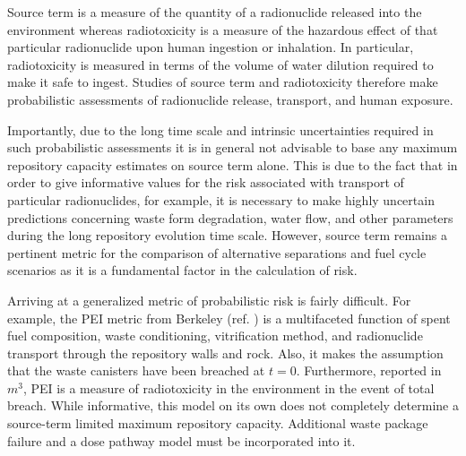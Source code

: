 Source term is a measure of the quantity of a radionuclide released into the 
environment whereas radiotoxicity is a measure of the hazardous effect of that 
particular radionuclide upon human ingestion or inhalation.  In particular, 
radiotoxicity is measured in terms of the volume of water dilution required to 
make it safe to ingest. Studies of source term and radiotoxicity therefore make 
probabilistic assessments of radionuclide release, transport, and human 
exposure.  

Importantly, due to the long time scale and intrinsic uncertainties required in 
such probabilistic assessments it is in general not advisable to base any 
maximum repository capacity estimates on source term alone. This is due to the fact 
that in order to give informative values for the risk associated with transport of 
particular radionuclides, for example, it is necessary to make highly uncertain  
predictions concerning waste form degradation, water flow, and other parameters 
during the long repository evolution time scale.  However, source term remains a 
pertinent metric for the comparison of alternative separations and fuel cycle
scenarios as it is a fundamental factor in the calculation of risk.

Arriving at a generalized metric of probabilistic risk is fairly difficult. For 
example, the \gls{PEI} metric from Berkeley (ref.  
\cite{bouvier_comparison_2007}) is a multifaceted function of spent fuel 
composition, waste conditioning, vitrification method, and radionuclide 
transport through the repository walls and rock.  Also, it makes the assumption 
that the waste canisters have been breached at $t=0$. Furthermore, reported in 
$m^3$, PEI is a measure of radiotoxicity in the environment in the event of 
total breach. While informative, this model on its own does not completely 
determine a source-term limited maximum repository capacity.  Additional waste 
package failure and a dose pathway model must be incorporated into it.

